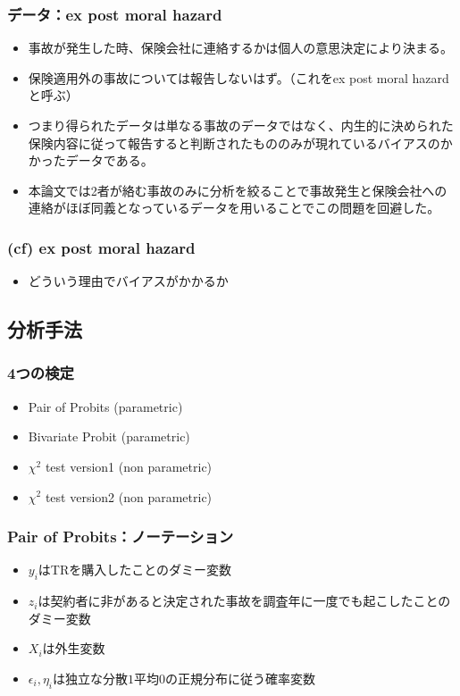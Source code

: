 \documentclass[dvipdfmx, 12pt]{beamer}
\begin{document}
\begin{frame}\frametitle{データ：ex post moral hazard}
	\begin{itemize}
	\item 事故が発生した時、保険会社に連絡するかは個人の意思決定により決まる。
	\item 保険適用外の事故については報告しないはず。（これをex post moral hazardと呼ぶ）
	\item つまり得られたデータは単なる事故のデータではなく、内生的に決められた保険内容に従って報告すると判断されたもののみが現れているバイアスのかかったデータである。
	\item 本論文では2者が絡む事故のみに分析を絞ることで事故発生と保険会社への連絡がほぼ同義となっているデータを用いることでこの問題を回避した。
	\end{itemize}
\end{frame}

\begin{frame}\frametitle{(cf) ex post moral hazard}
	\begin{itemize}
	\item どういう理由でバイアスがかかるか
	\end{itemize}
\end{frame}


\subsection{分析手法}
\begin{frame}\frametitle{4つの検定}
	\begin{itemize}
	\item Pair of Probits (parametric)
	\item Bivariate Probit (parametric)
	\item $\chi^2$ test version1 (non parametric)
	\item $\chi^2$ test version2 (non parametric)
	\end{itemize}
\end{frame}

\begin{frame}\frametitle{Pair of Probits：ノーテーション}
	\begin{itemize}
	\item $y_i$はTRを購入したことのダミー変数
	\item $z_i$は契約者に非があると決定された事故を調査年に一度でも起こしたことのダミー変数
	\item $X_i$は外生変数
	\item $\epsilon_i, \eta_i$は独立な分散$1$平均$0$の正規分布に従う確率変数
	\end{itemize}
\end{frame}
\end{document}
